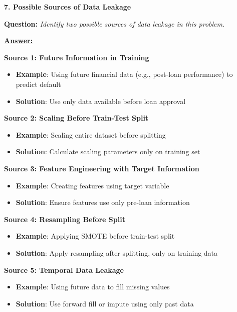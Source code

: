 \documentclass[11pt,a4paper]{article}
\newcommand{\questiontitle}[2]{%
    \vspace{0.4cm}%
    \noindent\textbf{\large\color{headerblue}#1. #2}\par\vspace{0.15cm}%
}
\newcommand{\qprompt}[1]{%
    \noindent\textbf{Question:} \textit{#1}\par\vspace{0.2cm}%
}
\newcommand{\answer}{\noindent\textbf{\underline{Answer:}}\par\vspace{0.15cm}}
\begin{document}
\questiontitle{7}{Possible Sources of Data Leakage}
\qprompt{Identify two possible sources of data leakage in this problem.}
\answer
\noindent\textbf{Source 1: Future Information in Training}
\begin{itemize}
    \item \textbf{Example}: Using future financial data (e.g., post-loan performance) to predict default
    \item \textbf{Solution}: Use only data available before loan approval
\end{itemize}

\noindent\textbf{Source 2: Scaling Before Train-Test Split}
\begin{itemize}
    \item \textbf{Example}: Scaling entire dataset before splitting
    \item \textbf{Solution}: Calculate scaling parameters only on training set
\end{itemize}

\noindent\textbf{Source 3: Feature Engineering with Target Information}
\begin{itemize}
    \item \textbf{Example}: Creating features using target variable
    \item \textbf{Solution}: Ensure features use only pre-loan information
\end{itemize}

\noindent\textbf{Source 4: Resampling Before Split}
\begin{itemize}
    \item \textbf{Example}: Applying SMOTE before train-test split
    \item \textbf{Solution}: Apply resampling after splitting, only on training data
\end{itemize}

\noindent\textbf{Source 5: Temporal Data Leakage}
\begin{itemize}
    \item \textbf{Example}: Using future data to fill missing values
    \item \textbf{Solution}: Use forward fill or impute using only past data
\end{itemize}

\vspace{0.35cm}
\end{document}
